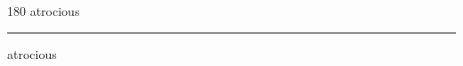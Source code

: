
\begin{frame}
\begin{center}
\begin{turn}{180}
{\fontsize{2.5cm}{1em}\selectfont atrocious}
\end{turn}
\vspace{1em}\par  
\hrule
\vspace{1em}\par  
{\fontsize{2.5cm}{1em}\selectfont atrocious}
\end{center}
\end{frame}
